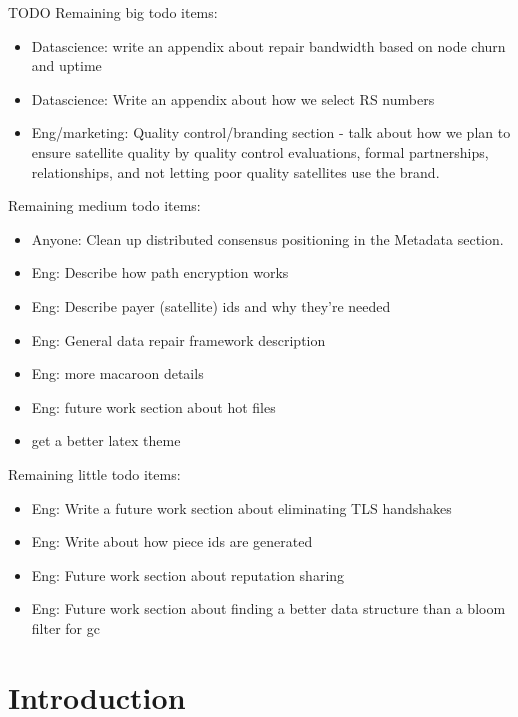 \documentclass[a4paper,10pt]{article} \usepackage[utf8]{inputenc}
\newcommand{\todo}[1]{{\color{red} TODO #1 }}
\begin{document}
\todo{
Remaining big todo items:
\begin{itemize}
\item Datascience: write an appendix about repair bandwidth based on node
  churn and uptime
\item Datascience: Write an appendix about how we select RS numbers
\item Eng/marketing: Quality control/branding section - talk about how we
  plan to ensure satellite quality by quality control evaluations, formal
  partnerships, relationships, and not letting poor quality satellites
  use the brand.
\end{itemize}

Remaining medium todo items:
\begin{itemize}
\item Anyone:
  Clean up distributed consensus positioning in the Metadata section.
\item Eng: Describe how path encryption works
\item Eng: Describe payer (satellite) ids and why they're needed
\item Eng: General data repair framework description
\item Eng: more macaroon details
\item Eng: future work section about hot files
\item get a better latex theme
\end{itemize}

Remaining little todo items:
\begin{itemize}
\item Eng: Write a future work section about eliminating TLS handshakes
\item Eng: Write about how piece ids are generated
\item Eng: Future work section about reputation sharing
\item Eng: Future work section about finding a better data structure than
 a bloom filter for gc
\end{itemize}
}

\section{Introduction}
\end{document}

